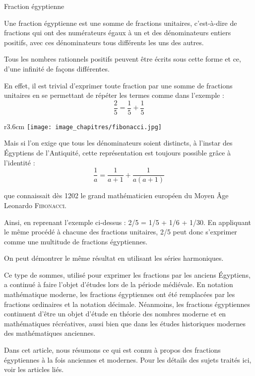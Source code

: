 
\begin{His}

{\large {\color{brown}Fraction égyptienne}}

\vspace{0.4cm}

Une fraction égyptienne est une somme de fractions unitaires, c'est-à-dire de fractions qui ont des numérateurs égaux à un et des dénominateurs entiers positifs, avec ces dénominateurs tous différents les uns des autres.

\vspace{0.2cm}

Tous les nombres rationnels positifs peuvent être écrits sous cette forme et ce, d'une infinité de façons différentes.

\vspace{0.2cm}

En effet, il est trivial d'exprimer toute fraction par une somme de fractions unitaires en se permettant de répéter les termes comme dans l'exemple :
$$\frac{2}{5}=\frac{1}{5}+\frac{1}{5}$$ 

\begin{wrapfigure}[10]{r}{3.6cm}
\vspace{-7mm}
\texttt{[image: image\_chapitres/fibonacci.jpg]}
\end{wrapfigure}

Mais si l'on exige que tous les dénominateurs soient distincts, à l'instar des Égyptiens de l'Antiquité, cette représentation est toujours possible grâce à l'identité :
$$\frac{1}{a}=\frac{1}{a+1}+\frac{1}{a(a+1)}$$

que connaissait dès 1202 le grand mathématicien européen du Moyen Âge Leonardo \textsc{Fibonacci}.

\vspace{0.2cm}

Ainsi, en reprenant l'exemple ci-dessus : 2/5 = 1/5 + 1/6 + 1/30. En appliquant le même procédé à chacune des fractions unitaires, 2/5 peut donc s'exprimer comme une multitude de fractions égyptiennes.

\vspace{0.2cm}

On peut démontrer le même résultat en utilisant les séries harmoniques.

\vspace{0.2cm}

Ce type de sommes, utilisé pour exprimer les fractions par les anciens Égyptiens, a continué à faire l'objet d'études lors de la période médiévale. En notation mathématique moderne, les fractions égyptiennes ont été remplacées par les fractions ordinaires et la notation décimale. Néanmoins, les fractions égyptiennes continuent d'être un objet d'étude en théorie des nombres moderne et en mathématiques récréatives, aussi bien que dans les études historiques modernes des mathématiques anciennes.

Dans cet article, nous résumons ce qui est connu à propos des fractions égyptiennes à la fois anciennes et modernes. Pour les détails des sujets traités ici, voir les articles liés.

\vspace{0.4cm}

\end{His}
